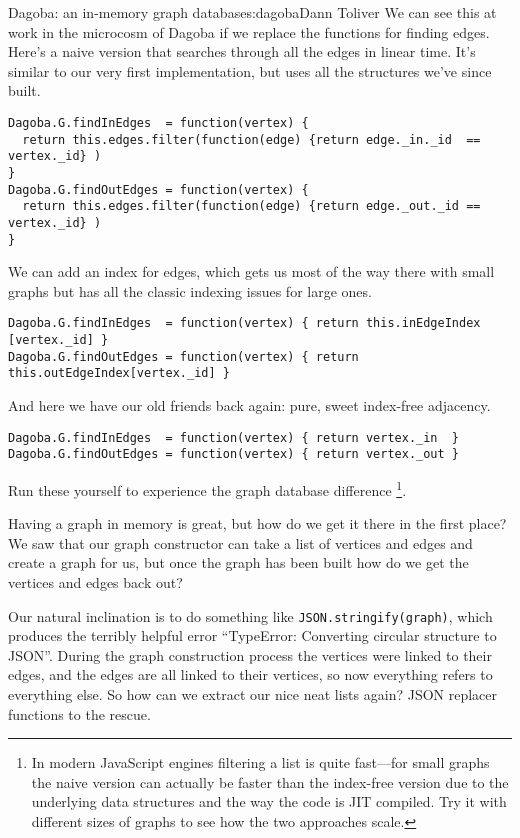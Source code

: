 \begin{aosachapter}{Dagoba: an in-memory graph database}{s:dagoba}{Dann Toliver}
We can see this at work in the microcosm of Dagoba if we replace the
functions for finding edges. Here's a naive version that searches
through all the edges in linear time. It's similar to our very first
implementation, but uses all the structures we've since built.

\begin{verbatim}
Dagoba.G.findInEdges  = function(vertex) {
  return this.edges.filter(function(edge) {return edge._in._id  == vertex._id} )
}
Dagoba.G.findOutEdges = function(vertex) {
  return this.edges.filter(function(edge) {return edge._out._id == vertex._id} )
}
\end{verbatim}

We can add an index for edges, which gets us most of the way there with
small graphs but has all the classic indexing issues for large ones.

\begin{verbatim}
Dagoba.G.findInEdges  = function(vertex) { return this.inEdgeIndex [vertex._id] }
Dagoba.G.findOutEdges = function(vertex) { return this.outEdgeIndex[vertex._id] }
\end{verbatim}

And here we have our old friends back again: pure, sweet index-free
adjacency.

\begin{verbatim}
Dagoba.G.findInEdges  = function(vertex) { return vertex._in  }
Dagoba.G.findOutEdges = function(vertex) { return vertex._out }
\end{verbatim}

Run these yourself to experience the graph database difference
\footnote{In modern JavaScript engines filtering a list is quite
  fast---for small graphs the naive version can actually be faster than
  the index-free version due to the underlying data structures and the
  way the code is JIT compiled. Try it with different sizes of graphs to
  see how the two approaches scale.}.

\label{serialization}

Having a graph in memory is great, but how do we get it there in the
first place? We saw that our graph constructor can take a list of
vertices and edges and create a graph for us, but once the graph has
been built how do we get the vertices and edges back out?

Our natural inclination is to do something like
\texttt{JSON.stringify(graph)}, which produces the terribly helpful
error ``TypeError: Converting circular structure to JSON''. During the
graph construction process the vertices were linked to their edges, and
the edges are all linked to their vertices, so now everything refers to
everything else. So how can we extract our nice neat lists again? JSON
replacer functions to the rescue.


\end{aosachapter}
